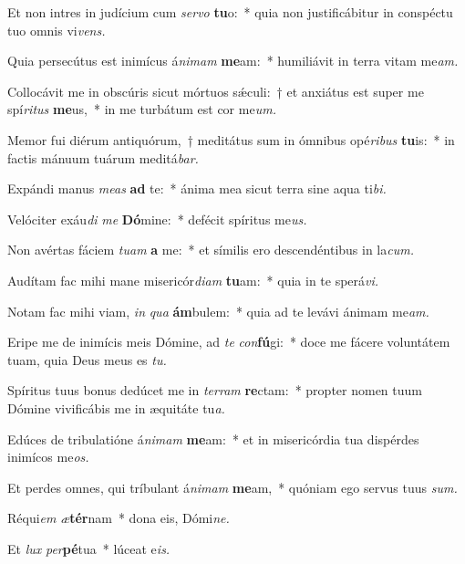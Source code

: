 \item Et non intres in judícium cum \textit{servo} \textbf{tu}o:~* quia non justificábitur in conspéctu tuo o\-mnis vi\textit{vens.}
\item Quia persecútus est inimícus á\hspace*{0.03em}\textit{nimam} \textbf{me}am:~* humiliávit in terra vitam me\textit{am.}
\item Collocávit me in obscúris sicut mórtuos sǽculi:~† et anxiátus est super me spí\textit{ritus} \textbf{me}us,~* in me turbátum est cor me\textit{um.}
\item Memor fui diérum antiquórum,~† meditátus sum in ómnibus opé\hspace*{0.03em}\textit{ribus} \textbf{tu}is:~* in factis mánuum tuárum meditá\textit{bar.}
\item Expándi manus \textit{meas} \textbf{ad} te:~* ánima mea sicut terra sine aqua ti\textit{bi.}
\item Velóciter exáu\hspace*{0.03em}\textit{di} \textit{me} \textbf{Dó}mine:~* defécit spíritus me\textit{us.}
\item Non avértas fáciem \textit{tuam} \textbf{a} me:~* et símilis ero descendéntibus in la\textit{cum.}
\item Audítam fac mihi mane misericór\textit{diam} \textbf{tu}am:~* quia in te sperá\hspace*{0.03em}\textit{vi.}
\item Notam fac mihi viam, \textit{in} \textit{qua} \textbf{ám}bulem:~* quia ad te levávi ánimam me\hspace*{0.03em}\textit{am.}
\item Eripe me de inimícis meis Dómine, ad \textit{te} \textit{con}\textbf{fú}gi:~* doce me fácere voluntátem tuam, quia Deus meus es \textit{tu.}
\item Spíritus tuus bonus dedúcet me in \textit{terram} \textbf{re}ctam:~* propter nomen tuum Dómine vivificábis me in æquitáte tu\hspace*{0.03em}\textit{a.}
\item Edúces de tribulatióne á\hspace*{0.03em}\textit{nimam} \textbf{me}am:~* et in misericórdia tua dispérdes inimícos me\textit{os.}
\item Et perdes omnes, qui tríbulant á\textit{nimam} \textbf{me}am,~* quóniam ego servus tuus \textit{sum.}
\item Réqui\hspace*{0.03em}\textit{em} \textit{æ}\textbf{tér}nam~* dona eis, Dómi\textit{ne.}
\item Et \textit{lux} \textit{per}\textbf{pé}tua~* lúceat e\hspace*{0.03em}\textit{is.}